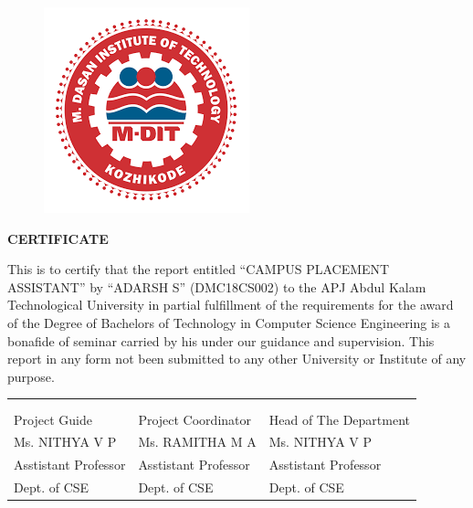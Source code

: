 \documentclass[12pt]{article}
\begin{document}
\begin{changemargin}{0.5cm}{0.5cm}
\begin{figure}[H]
\begin{center}
\includegraphics[scale=.4]{MDIT}
\end{center} 
\end{figure}
\begin{center}\LARGE\bf{CERTIFICATE} \end{center}
\vspace{5mm}
\justifying
This is to certify that the report entitled “CAMPUS PLACEMENT ASSISTANT” by “ADARSH S” (DMC18CS002) to the APJ Abdul Kalam Technological University in partial fulfillment of the requirements for the award of the Degree of Bachelors of Technology in Computer Science Engineering is a bonafide of seminar carried by his under our guidance and supervision. This report in any form not been submitted to any other University or Institute of any purpose.
\thispagestyle{empty}
\begin{center}
\begin{tabularx}{1\textwidth} { 
  >{\raggedright\arraybackslash}X 
   >{\raggedright\arraybackslash}X 
   >{\raggedright\arraybackslash}X }
 
\\  \\ \\ 

Project Guide & Project Coordinator & Head of The Department  \\  

Ms. NITHYA V P  & Ms. RAMITHA M A   & Ms. NITHYA V P \\ 

Asstistant Professor & Asstistant Professor &Asstistant Professor \\  

Dept. of CSE & Dept. of CSE & Dept. of CSE   


\end{tabularx}
\end{center}


\end{changemargin}
\end{document}
